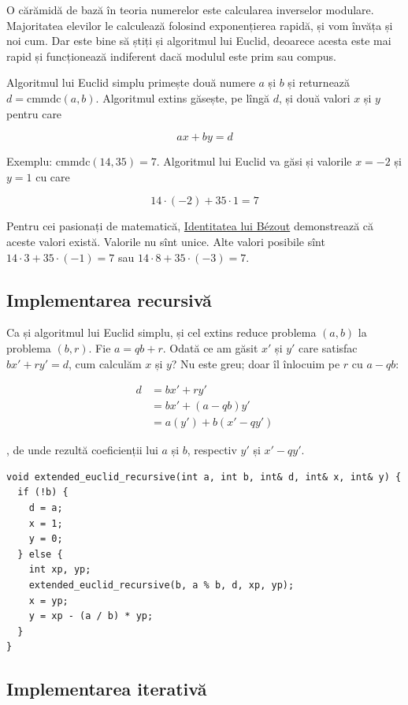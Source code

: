 \documentclass[../main.tex]{subfiles}
\begin{document}
O cărămidă de bază în teoria numerelor este calcularea inverselor modulare. Majoritatea elevilor le calculează folosind exponențierea rapidă, și vom învăța și noi cum. Dar este bine să știți și algoritmul lui Euclid, deoarece acesta este mai rapid și funcționează indiferent dacă modulul este prim sau compus.

Algoritmul lui Euclid simplu primește două numere $a$ și $b$ și returnează $d = \text{cmmdc}(a, b)$. Algoritmul extins găsește, pe lîngă $d$, și două valori $x$ și $y$ pentru care

$$ax + by = d$$

Exemplu: $\text{cmmdc}(14, 35) = 7$. Algoritmul lui Euclid va găsi și valorile $x = -2$ și $y = 1$ cu care

$$14 \cdot (-2) + 35 \cdot 1 = 7$$

Pentru cei pasionați de matematică, \href{https://en.wikipedia.org/wiki/B\%C3\%A9zout's_identity}{Identitatea lui Bézout} demonstrează că aceste valori există. Valorile nu sînt unice. Alte valori posibile sînt $14 \cdot 3 + 35 \cdot (-1) = 7$ sau $14 \cdot 8 + 35 \cdot (-3) = 7$.

\subsection{Implementarea recursivă}

Ca și algoritmul lui Euclid simplu, și cel extins reduce problema $(a,b)$ la problema $(b,r)$. Fie $a = qb + r$. Odată ce am găsit $x'$ și $y'$ care satisfac $bx' + ry' = d$, cum calculăm $x$ și $y$? Nu este greu; doar îl înlocuim pe $r$ cu $a - qb$:

\begin{align*}
  d &= bx' +ry' \\
    &= bx' + (a - qb)y' \\
    &= a(y') + b(x' - qy')
\end{align*}

, de unde rezultă coeficienții lui $a$ și $b$, respectiv $y'$ și $x' - qy'$.

\begin{verbatim}
void extended_euclid_recursive(int a, int b, int& d, int& x, int& y) {
  if (!b) {
    d = a;
    x = 1;
    y = 0;
  } else {
    int xp, yp;
    extended_euclid_recursive(b, a % b, d, xp, yp);
    x = yp;
    y = xp - (a / b) * yp;
  }
}
\end{verbatim}

\subsection{Implementarea iterativă}
\end{document}
